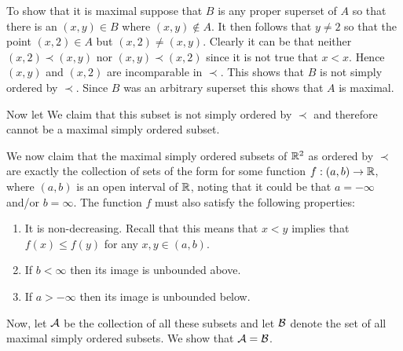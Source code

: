 {{    To show that it is maximal suppose that $B$ is any proper superset of $A$ so that there is an $(x,y) \in B$ where $(x,y) \notin A$.
    It then follows that $y \neq 2$ so that the point $(x, 2) \in A$ but $(x,2) \neq (x,y)$.
    Clearly it can be that neither $(x,2) \prec (x,y)$ nor $(x,y) \prec (x,2)$ since it is not true that $x < x$.
    Hence $(x,y)$ and $(x,2)$ are incomparable in $\prec$.
    This shows that $B$ is not simply ordered by $\prec$.
    Since $B$ was an arbitrary superset this shows that $A$ is maximal.
  }

  Now let
  We claim that this subset is not simply ordered by $\prec$ and therefore cannot be a maximal simply ordered subset.

  We now claim that the maximal simply ordered subsets of ${\mathbb{R}}^2$ as ordered by $\prec$ are exactly the collection of sets of the form
  for some function $f: (a,b) \to {\mathbb{R}}$, where $(a,b)$ is an open interval of ${\mathbb{R}}$, noting that it could be that $a = -\infty$ and/or $b = \infty$.
  The function $f$ must also satisfy the following properties:
  \begin{enumerate}[label=(\roman*)]
  \item It is non-decreasing.
    Recall that this means that $x < y$ implies that $f(x) \leq f(y)$ for any $x,y \in (a,b)$.
  \item If $b < \infty$ then its image is unbounded above.
  \item If $a > -\infty$ then its image is unbounded below.
  \end{enumerate}
  Now, let $\mathcal{A}$ be the collection of all these subsets and let $\mathcal{B}$ denote the set of all maximal simply ordered subsets.
  We show that $\mathcal{A} = \mathcal{B}$.
  }
